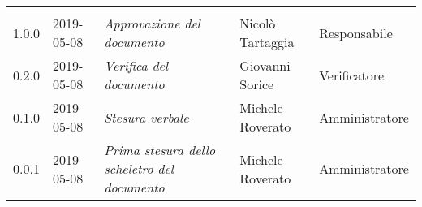 \newpage 
\section*{}
	\begin{longtable}{C{2cm}|C{2.5cm}|C{4.5cm}|C{2.5cm}|C{3cm}}
	
	 &  &  &  &   \\
	\endhead
		
		1.0.0 & 2019-05-08 &  \emph{Approvazione del documento} & Nicolò Tartaggia & Responsabile\\
		\hline
		
		0.2.0 & 2019-05-08 & \emph{Verifica del documento} & Giovanni Sorice & Verificatore \\
		\hline
		
		0.1.0 & 2019-05-08 & \emph{Stesura verbale} & Michele Roverato & Amministratore \\
		\hline
		
		0.0.1 & 2019-05-08 & \emph{Prima stesura dello scheletro del documento} & Michele Roverato & Amministratore \\
		
\end{longtable}



\clearpage